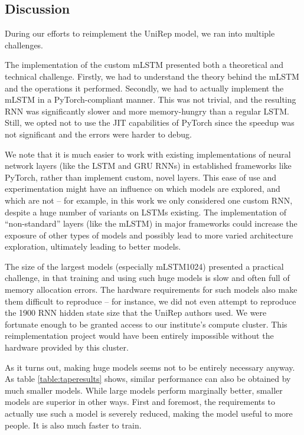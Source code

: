 \documentclass[a4paper,12pt]{article}
\begin{document}
\subsection{Discussion}
\label{section:reproduction_challenges}
During our efforts to reimplement the UniRep model, we ran into multiple challenges.

The implementation of the custom mLSTM presented both a theoretical and technical challenge. Firstly, we had to understand the theory behind the mLSTM and the operations it performed. Secondly, we had to actually implement the mLSTM in a PyTorch-compliant manner. This was not trivial, and the resulting RNN was significantly slower and more memory-hungry than a regular LSTM. Still, we opted not to use the JIT capabilities of PyTorch since the speedup was not significant and the errors were harder to debug.

We note that it is much easier to work with existing implementations of neural network layers (like the LSTM and GRU RNNs) in established frameworks like PyTorch, rather than implement custom, novel layers. This ease of use and experimentation might have an influence on which models are explored, and which are not -- for example, in this work we only considered one custom RNN, despite a huge number of variants on LSTMs existing. The implementation of ``non-standard'' layers (like the mLSTM) in major frameworks could increase the exposure of other types of models and possibly lead to more varied architecture exploration, ultimately leading to better models.

The size of the largest models (especially mLSTM1024) presented a practical challenge, in that training and using such huge models is slow and often full of memory allocation errors. The hardware requirements for such models also make them difficult to reproduce -- for instance, we did not even attempt to reproduce the 1900 RNN hidden state size that the UniRep authors used. We were fortunate enough to be granted access to our institute's compute cluster. This reimplementation project would have been entirely impossible without the hardware provided by this cluster.

As it turns out, making huge models seems not to be entirely necessary anyway. As table \ref{table:taperesults} shows, similar performance can also be obtained by much smaller models. While large models perform marginally better, smaller models are superior in other ways. First and foremost, the requirements to actually use such a model is severely reduced, making the model useful to more people. It is also much faster to train.
\end{document}
